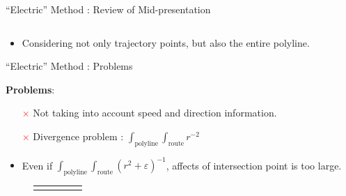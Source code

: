 \documentclass[aspectratio=169, bigfiles]{beamer}
\def\red(#1){\textcolor{red}{#1}}
\begin{document}
\begin{frame}{``Electric'' Method : Review of Mid-presentation}
\begin{figure}[H]
\begin{tabular}{ccccc}
\end{tabular}
\end{figure}
\begin{tcolorbox}[colframe=yellow,
colback=yellow!10!white,
colbacktitle=yellow!40!white,
coltitle=black, fonttitle=\bfseries]
\begin{itemize}
    \item
    Considering not only trajectory points, but also the entire polyline.  
\end{itemize}
\end{tcolorbox}
\end{frame}



\begin{frame}{``Electric'' Method : Problems}
\vspace{-2mm}
\begin{tcolorbox}[colframe=yellow,
colback=yellow!10!white,
colbacktitle=yellow!40!white,
coltitle=black, fonttitle=\bfseries]
\vspace{-1mm}
\textbf{Problems}: 
    \begin{itemize}
        \item[\red($\times$)]
        Not taking into account speed and direction information.
        \item[\red($\times$)]
        Divergence problem : $\int_{\mathrm{polyline}}\int_{\mathrm{route}}r^{-2}$
        \vspace{-2mm}
    \end{itemize}
\end{tcolorbox}
\vspace{-1mm}
\begin{itemize}
    \item
    Even if $\int_{\mathrm{polyline}}\int_{\mathrm{route}}(r^{2}+\varepsilon)^{-1}$, affects of intersection point is too large.
\end{itemize}
\vspace{-3.0mm}
\begin{figure}[H]
\begin{tabular}{ccccc}
\begin{minipage}{0.25\hsize}
\begin{center}
\begin{tikzpicture}%

\end{tikzpicture}
\end{center}
\end{minipage}
\end{tabular}
\end{figure}
\end{frame}
\end{document}
